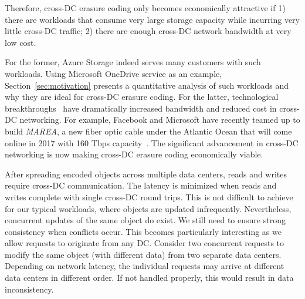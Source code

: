 Therefore, cross-DC erasure coding only becomes economically attractive if 1)
there are workloads that consume very large storage capacity while incurring very
little cross-DC traffic; 2) there are enough cross-DC network bandwidth at very
low cost.

 For the former, Azure Storage indeed serves many customers
with such workloads. Using Microsoft OneDrive service as an example,
Section~\ref{sec:motivation} presents a quantitative analysis of such workloads
and why they are ideal for cross-DC erasure coding. For the latter,
technological breakthroughs~\cite{mears1986low, zhu2011112} have dramatically increased
bandwidth and reduced cost in cross-DC networking. For example, Facebook and
Microsoft have recently teamed up to build \textit{MAREA}, a new fiber optic
cable under the Atlantic Ocean that 
will come online in 2017 with 160 Tbps capacity~\cite{bib:MAREA1, bib:MAREA2}.
 The significant advancement in cross-DC
networking is now making cross-DC erasure coding economically viable.



 After spreading encoded objects across multiple data centers,
reads and writes require cross-DC communication. The latency is minimized when
reads and writes complete with single cross-DC round trips. This is not
difficult to achieve for our typical workloads, where objects are updated
infrequently. Nevertheless, concurrent updates of the same object do exist. We
still need to ensure strong consistency when conflicts occur. This becomes
particularly interesting as we allow requests to originate from any DC. Consider
two concurrent requests to modify the same object (with different data) from two
separate data centers. Depending on network latency, the individual requests may
arrive at different data centers in different order. If not handled properly,
this would result in data inconsistency.

